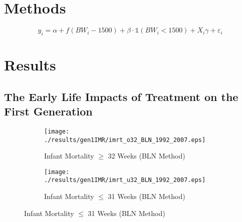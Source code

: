 \documentclass[11pt]{article}
\begin{document}
\begin{spacing}{1.5}
  
  
  
  
  

  
  \clearpage
  \section{Methods}

  \begin{equation}
    y_i = \alpha + f(BW_i-1500) + \beta \cdot \mathbb{1}(BW_i<1500)+X_i\gamma + \varepsilon_i
  \end{equation}

  \citet{Almondetal2010,Bharadwajetal2013}

  \citet{Calonicoetal2020a,Calonicoetal2014}
  
  \citet{Barrecaetal2011}

  \citet{RomanoWolf2005}

  \citet{GelmanImbens2019}
  
  \clearpage
  \section{Results}
  \subsection{The Early Life Impacts of Treatment on the First Generation}
  \begin{figure}[htpb!]
    \caption{Birthweight Assignment Thresholds and Infant Mortality}
    \label{fig:IMR}
    \begin{subfigure}{.49\textwidth}
      \centering
      \texttt{[image: ./results/gen1IMR/imrt\_o32\_BLN\_1992\_2007.eps]}
      \caption{Infant Mortality $\geq$ 32 Weeks (BLN Method)}
      \label{fig:IMRBLN32}
    \end{subfigure}
    \begin{subfigure}{.49\textwidth}
      \centering
      \texttt{[image: ./results/gen1IMR/imrt\_u32\_BLN\_1992\_2007.eps]}
      \caption{Infant Mortality $\leq$ 31 Weeks (BLN Method)}
      \label{fig:IMRBLN31}
    \end{subfigure}


\end{figure}
\end{spacing}
\end{document}
